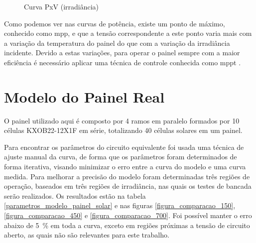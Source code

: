 \begin{figure}[!htpb]
\begin{minipage}{.5\textwidth}
\begin{center}
\caption{Curva PxV (irradiância)}
\label{figura_potência_painel_irradiância}
\end{center}
\end{minipage}
\end{figure}

Como podemos ver nas curvas de potência, existe um ponto de máximo, conhecido como \gls{mpp}, e que a tensão correspondente a este ponto varia mais com a variação da temperatura do painel do que com a variação da irradiância incidente. Devido a estas variações, para operar o painel sempre com a maior eficiência é necessário aplicar uma técnica de controle conhecida como \gls{mppt} \cite{ahmed2016}.

\section{Modelo do Painel Real}

O painel utilizado aqui é composto por 4 ramos em paralelo formados por 10 células KXOB22-12X1F em série, totalizando 40 células solares em um painel.

Para encontrar os parâmetros do circuito equivalente foi usada uma técnica de ajuste manual da curva, de forma que os parâmetros foram determinados de forma iterativa, visando minimizar o erro entre a curva do modelo e uma curva medida. Para melhorar a precisão do modelo foram determinadas três regiões de operação, baseados em três regiões de irradiância, nas quais os testes de bancada serão realizados. Os resultados estão na tabela \ref{parametros_modelo_painel_solar} e nas figuras \ref{figura_comparacao_150}, \ref{figura_comparacao_450} e \ref{figura_comparacao_700}. Foi possível manter o erro abaixo de \SI{5}{\percent} em toda a curva, exceto em regiões próximas a tensão de circuito aberto, as quais não são relevantes para este trabalho.

